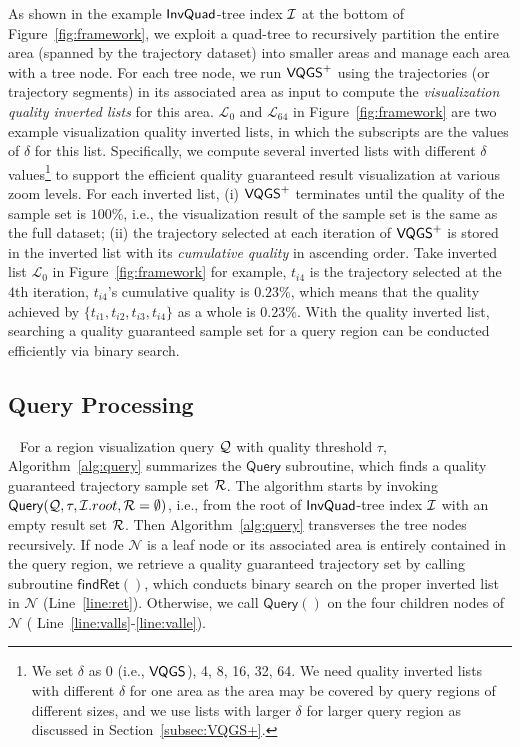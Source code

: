 As shown in the example $\mathsf{InvQuad}$-tree index $\mathcal{I}$ at the bottom of Figure~\ref{fig:framework}, we exploit a quad-tree to recursively partition the entire area (spanned by the trajectory dataset) into smaller areas and manage each area with a tree node.
For each tree node, we run $\mathsf{VQGS}^+$ using the trajectories (or trajectory segments) in its associated area as input to compute the \textit{visualization quality inverted lists} for this area. $\mathcal{L}_0$ and $\mathcal{L}_{64}$ in Figure~\ref{fig:framework} are two example visualization quality inverted lists, in which the subscripts are the values of $\delta$ for this list.
Specifically, we compute several inverted lists with different $\delta$ values\footnote{We set $\delta$ as 0 (i.e., $\mathsf{VQGS}$), 4, 8, 16, 32, 64. We need quality inverted lists with different $\delta$ for one area as the area may be covered by query regions of different sizes, and we use lists with larger $\delta$ for larger query region as discussed in Section~\ref{subsec:VQGS+}.} to support the efficient quality guaranteed result visualization at various zoom levels.
For each inverted list, (i) $\mathsf{VQGS}^+$ terminates until the quality of the sample set is $100\%$, i.e., the visualization result of the sample set is the same as the full dataset;
(ii) the trajectory selected at each iteration of $\mathsf{VQGS}^+$ is stored in the inverted list with its \textit{cumulative quality} in ascending order. Take inverted list $\mathcal{L}_0$ in Figure~\ref{fig:framework} for example, $t_{i4}$ is the trajectory selected at the $4$th iteration,
$t_{i4}$'s cumulative quality is $0.23\%$, which means that the quality achieved by $\{t_{i1}, t_{i2}, t_{i3}, t_{i4}\}$ as a whole is $0.23\%$. With the quality inverted list, searching a quality guaranteed sample set for a query region can be conducted efficiently via binary search.


\subsection{Query Processing}~\label{sec:query}
For a region visualization query $\mathcal{Q}$ with quality threshold $\tau$, Algorithm~\ref{alg:query} summarizes the $\mathsf{Query}$ subroutine, which finds a quality guaranteed trajectory sample set $\mathcal{R}$. The algorithm starts by invoking $\mathsf{Query}(\mathcal{Q}, \tau, \mathcal{I}.root, \mathcal{R}=\emptyset)$, i.e., from the root of $\mathsf{InvQuad}$-tree index $\mathcal{I}$ with an empty result set $\mathcal{R}$. Then Algorithm~\ref{alg:query} transverses the tree nodes recursively. If node   $\mathcal{N}$ is a leaf node or its associated area is entirely contained in the query region, we retrieve a quality guaranteed trajectory set by calling subroutine $\mathsf{findRet}()$, which conducts binary search on the proper inverted list in $\mathcal{N}$ (Line~\ref{line:ret}). Otherwise, we call $\mathsf{Query}()$ on the four children nodes of $\mathcal{N}$ ( Line~\ref{line:valls}-\ref{line:valle}).



